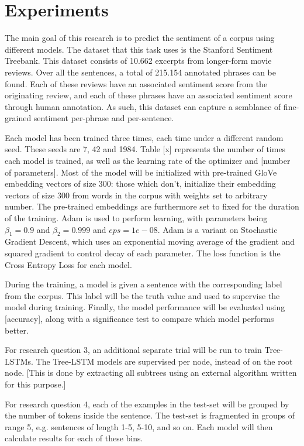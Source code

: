 \section{Experiments}
\label{sec: experiments}
The main goal of this research is to predict the sentiment of a corpus using
different models. The dataset that this task uses is the Stanford
Sentiment Treebank\cite{socher2013recursive}. This dataset consists of 10.662
excerpts from longer-form movie reviews. Over all the sentences, a total of
215.154 annotated phrases can be found. Each of these reviews have an associated
sentiment score from the originating review, and each of these phrases have an
associated sentiment score through human annotation. As such, this dataset can 
capture a semblance of fine-grained sentiment per-phrase and per-sentence.

Each model has been trained three times, each time under a different random
seed. These seeds are 7, 42 and 1984. Table [x] represents the number of times
each model is trained, as well as the learning rate of the optimizer and [number
of parameters]. Most of the model will be initialized with pre-trained
GloVe\cite{pennington2014glove} embedding vectors of size 300: those which
don't, initialize their embedding vectors of size 300 from words in the corpus
with weights set to arbitrary number. The pre-trained embeddings are furthermore
set to fixed for the duration of the training.
Adam\cite{DBLP:journals/corr/KingmaB14} is used to perform learning, with
parameters being $\beta_{1}=0.9$ and $\beta_{2}=0.999$ and $eps=1e-08$. Adam is
a variant on Stochastic Gradient Descent, which uses an exponential moving
average of the gradient and squared gradient to control decay of each parameter.
The loss function is the Cross Entropy Loss for each model.

During the training, a model is given a sentence with the corresponding label
from the corpus. This label will be the truth value and used to supervise the
model during training. Finally, the model performance will be evaluated using
[accuracy], along with a significance test to compare which model performs
better.

For research question 3, an additional separate trial will be run to train
Tree-LSTMs. The Tree-LSTM models are supervised per node, instead of on the root
node. [This is done by extracting all subtrees using an external algorithm
written for this purpose.]

For research question 4, each of the examples in the test-set will be grouped by
the number of tokens inside the sentence. The test-set is fragmented in groups
of range 5, e.g. sentences of length 1-5, 5-10, and so on. Each model will then
calculate results for each of these bins.

